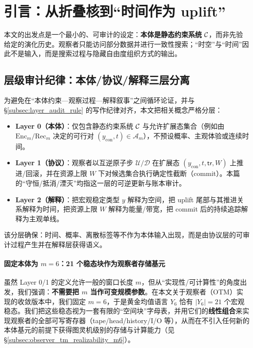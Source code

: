 \section{引言：从折叠核到“时间作为 uplift”}

本文的出发点是一个最小的、可审计的设定：\textbf{本体是静态约束系统} \(\mathcal{C}\)，而非先验给定的演化历史。观察者只能访问部分数据并进行一致性搜索；“时空”与“时间”因此不是输入，而是搜索过程与隐藏自由度组织方式的输出。

\subsection{层级审计纪律：本体/协议/解释三层分离}
为避免在“本体约束—观察过程—解释叙事”之间循环论证，并与 \S\ref{subsec:layer_audit_rule} 的写作纪律对齐，本文把相关概念严格分层：
\begin{itemize}
  \item \textbf{Layer 0（本体）}：仅包含静态约束系统 \(\mathcal{C}\) 与允许扩展态集合（例如由 \(\mathrm{Enc}_m/\mathrm{Rec}_m\) 决定的可行对 \((y_{\mathrm{con}},t)\in\mathcal A_m\)），不预设概率、主观体验或连续时间。
  \item \textbf{Layer 1（协议）}：观察者以互逆原子步 \(\mathcal U/\mathcal D\) 在扩展态 \((y_{\mathrm{con}},t,\mathsf{tr},W)\) 上推进/回滚，并在资源上限 \(W\) 下对候选集合执行确定性截断（commit）。本篇的“守恒/抵消/湮灭”均指这一层的可逆更新与账本审计。
  \item \textbf{Layer 2（解释）}：把宏观稳定类型 \(y\) 解释为空间，把 uplift 尾部与其推进关系解释为时间，把资源上限 \(W\) 解释为能量/带宽，把 commit 后的持续追踪解释为主观单线。
\end{itemize}
该分层确保：时间、概率、离散标签等不作为本体输入出现，而是由协议层的可审计过程产生并在解释层获得语义。

\paragraph{固定本体为 \texorpdfstring{$m=6$}{m=6}：21 个稳态块作为观察者存储基元}
虽然 Layer 0/1 的定义允许一般的窗口长度 \(m\)，但从“实现性/可计算性”的角度出发，我们强调：\textbf{不需要把 \(m\) 当作可变规模参数}。在本文关于观察者（OTM）实现的收敛版本中，我们固定 \(m=6\)，于是黄金均值语言 \(Y_6\) 恰有 \(|Y_6|=21\) 个宏观稳态。我们把这些稳态视为一套有限的“空间块”字母表，并用它们的\textbf{线性组合}来实现观察者的全部可写寄存器（tape/head/history/I/O 等），从而在不引入任何新的本体基元的前提下获得图灵机级别的存储与计算能力（见 \S\ref{subsec:observer_tm_realizability_m6}）。

